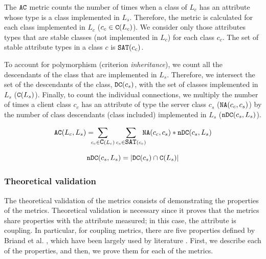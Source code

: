 The $\verb|AC|$ metric counts the number of times when a class of $L_c$ has an attribute whose type is a class implemented in $L_s$. Therefore, the metric is calculated for each class implemented in $L_c$ ($c_c \in \verb|C|(L_c)$). We consider only those attributes types that are stable classes (not implemented in $L_c$) for each class $c_c$. The set of stable attribute types in a class $c$ is $\verb|SAT|(c_c)$.

To account for polymorphism (criterion \textit{inheritance}), we count all the descendants of the class that are implemented in $L_s$. Therefore, we intersect the set of the descendants of the class, $\verb|DC|(c_s)$, with the set of
classes implemented in $L_s$ ($\verb|C|(L_s)$). Finally, to count the  individual connections, we multiply the number of times a client class $c_c$ has an attribute of type the server class $c_s$ ($\verb|NA|(c_c, c_s)$) by the number of class descendants (class included) implemented in $L_s$ ($\verb|nDC|(c_s,L_s)$).

\begin{equation}
\label{eqn:ac}
  \verb|AC|(L_c,L_s) = \!\!\!\!\sum_{c_c \in \verb|C|(L_c)} \sum_{c_s \in \verb|SAT|(c_c)} \!\!\!\!\verb|NA|(c_c, c_s)*\verb|nDC|(c_s, L_s)
\end{equation}

\begin{equation}
\label{eqn:ac-ndc}
    \verb|nDC|(c_s, L_s) = |\verb|DC|(c_s) \cap \verb|C|(L_s)|
\end{equation}

\subsubsection{Theoretical validation}
The theoretical validation of the metrics consists of demonstrating the properties of the metrics. Theoretical validation is necessary since it proves that the metrics share properties with the attribute measured; in this case, the attribute is coupling. In particular, for coupling metrics, there are five properties defined by Briand et al. \cite{briand1996property}, which have been largely used by literature \cite{poshyvanyk2006conceptual, allen1999measuring, zhao2004measuring}. First, we describe each of the properties, and then, we prove them for each of the metrics.


